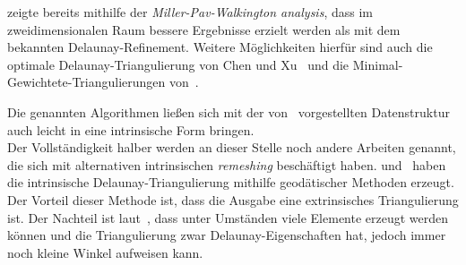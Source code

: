 \citet{rand:2011:Miller-Pav-Walkington} zeigte bereits mithilfe der \textit{Miller-Pav-Walkington analysis}, dass im zweidimensionalen Raum bessere Ergebnisse erzielt werden als mit dem bekannten Delaunay-Refinement.
Weitere Möglichkeiten hierfür sind auch die optimale Delaunay-Triangulierung von Chen und Xu~\cite{chen:2004:mesh-odt,chen:2004:optimal-delaunay-triangulation} und die Minimal-Gewichtete-Triangulierungen von~\citet{mulzer:2008:minimum}.

Die genannten Algorithmen ließen sich mit der von~\citet{Sharp:2019:NIT} vorgestellten Datenstruktur auch leicht in eine intrinsische Form bringen.\\

Der Vollständigkeit halber werden an dieser Stelle noch andere Arbeiten genannt, die sich mit alternativen intrinsischen \textit{remeshing} beschäftigt haben. \citet{liu:2017:geodesic_Voronoi} und~\citet{xin:2011:geodesic_delaunay} haben die intrinsische Delaunay-Triangulierung mithilfe  geodätischer Methoden erzeugt. Der Vorteil dieser Methode ist, dass die Ausgabe eine extrinsisches Triangulierung ist. Der Nachteil ist laut~\citet{Sharp:2019:NIT}, dass unter Umständen viele Elemente erzeugt werden können und die Triangulierung zwar Delaunay-Eigenschaften hat, jedoch immer noch kleine Winkel aufweisen kann.\\ %